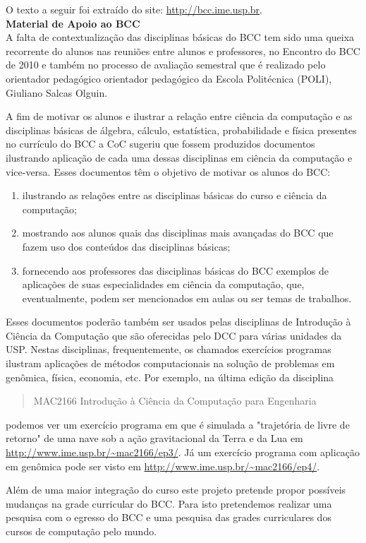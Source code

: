 O texto a seguir foi extraído do site: \url{http://bcc.ime.usp.br}. \\

{\large \textbf{Material de Apoio ao BCC}} \\

A falta de contextualização das disciplinas básicas do BCC tem sido uma queixa recorrente do alunos nas reuniões entre alunos e professores, no Encontro do BCC de 2010 e também no processo de avaliação semestral que é realizado pelo orientador pedagógico orientador pedagógico da Escola Politécnica (POLI), Giuliano Salcas Olguin.

A fim de motivar os alunos e ilustrar a relação entre ciência da computação e as disciplinas básicas de álgebra, cálculo, estatística, probabilidade e física presentes no currículo do BCC a CoC sugeriu que fossem produzidos documentos ilustrando aplicação de cada uma dessas disciplinas em ciência da computação e vice-versa.  Esses documentos têm o objetivo de motivar os alunos do BCC:

\begin{enumerate}
\item ilustrando as relações entre as disciplinas básicas do curso e ciência da computação;
\item mostrando aos alunos quais das disciplinas mais avançadas do BCC que fazem uso dos conteúdos das disciplinas básicas;
\item fornecendo aos professores das disciplinas básicas do BCC exemplos de aplicações de suas especialidades em ciência da computação, que, eventualmente, podem ser mencionados em aulas ou ser temas de trabalhos.
\end{enumerate}

Esses documentos poderão também ser usados pelas disciplinas de Introdução à Ciência da Computação que são oferecidas pelo DCC para várias unidades da USP. Nestas disciplinas, frequentemente, os chamados exercícios programas ilustram aplicações de métodos computacionais na solução de problemas em genômica, física, economia, etc.
Por exemplo, na última edição da disciplina \begin{quote} MAC2166 Introdução à Ciência da Computação para Engenharia \end{quote}
podemos ver um exercício programa em que é simulada a "trajetória de livre de retorno" de uma nave sob a ação gravitacional da Terra e da Lua em \url{http://www.ime.usp.br/~mac2166/ep3/}. Já um exercício programa com aplicação em genômica pode ser visto em \url{http://www.ime.usp.br/~mac2166/ep4/}.

Além de uma maior integração do curso este projeto pretende propor possíveis mudanças na grade curricular do BCC. Para isto pretendemos realizar uma pesquisa com o egresso do BCC e uma pesquisa das grades curriculares dos cursos de computação pelo mundo.
